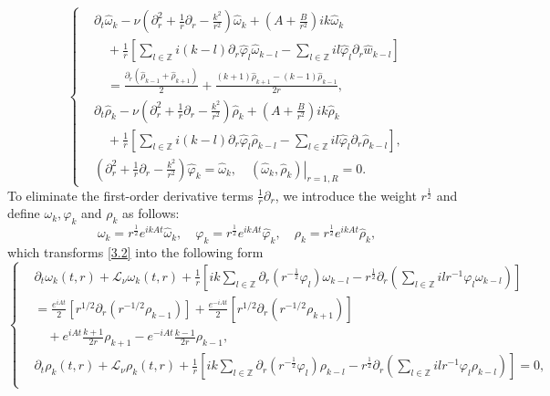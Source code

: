 \documentclass[final, 12pt,reqno]{amsart}
\numberwithin{equation}{section}
\begin{document}
\begin{equation}\label{3.2}
    \left\{
    \begin{aligned}
        &   \partial_t \hat{\omega}_k-\nu\left(\partial_r^2+\frac{1}{r} \partial_r-\frac{k^2}{r^2} \right) \hat{\omega}_k+\left(A+\frac{B}{r^2}\right) ik \hat{\omega}_k\\
  &\quad+\frac{1}{r}\left[ \sum_{l \in \mathbb{Z}} i (k-l)\partial_r\hat{\varphi}_l \hat{\omega}_{k-l}- \sum_{l \in \mathbb{Z}} i l  \hat{\varphi}_l \partial_r\hat{w}_{k-l}\right]\\
        &\quad=\frac{\partial_{r}(\hat{\rho}_{k-1}+\hat{\rho}_{k+1})}{2}+ \frac{(k+1)\hat{\rho}_{k+1}-(k-1)\hat{\rho}_{k-1}}{2r},\\
        &   \partial_t \hat{\rho}_k-\nu\left(\partial_r^2+\frac{1}{r} \partial_r-\frac{k^2}{r^2} \right) \hat{\rho}_k+\left(A+\frac{B}{r^2}\right) ik \hat{\rho}_k \\
  &\quad+\frac{1}{r}\left[ \sum_{l \in \mathbb{Z}} i (k-l)\partial_r\hat{\varphi}_l \hat{\rho}_{k-l}- \sum_{l \in \mathbb{Z}} i l  \hat{\varphi}_l \partial_r\hat{\rho}_{k-l}\right],\\
        &   \left(\partial_r^2+\frac{1}{r} \partial_r-\frac{k^2}{r^2}\right) \hat{\varphi}_k=\hat{\omega}_k,\left.\quad (\hat{\omega}_k,\hat{\rho}_k)\right|_{r=1, R}=0  .
    \end{aligned}
    \right.
\end{equation}
To eliminate the first-order derivative terms $\frac{1}{r} \partial_r$, we introduce the weight $r^{\frac{1}{2}}$ and define $\omega_k,\varphi_k$ and $\rho_k$ as follows:$$\omega_k=r^{\frac{1}{2}} e^{i k A t} \hat{\omega}_k, \quad \varphi_k=r^{\frac{1}{2}} e^{i k A t} \hat{\varphi}_k,\quad \rho_k=r^{\frac{1}{2}} e^{i k A t} \hat{\rho}_k,$$ which transforms \eqref{3.2} into the following form
\begin{equation}\label{3.3}
    \left\{
    \begin{aligned}
        &\partial_t\omega_k(t,r)+\mathcal{L}_\nu{\omega}_k(t,r)+\frac{1}{r}\left[i k \sum_{l \in \mathbb{Z}} \partial_r\left(r^{-\frac{1}{2}} \varphi_l\right) \omega_{k-l}-r^{\frac{1}{2}} \partial_r\left(\sum_{l \in \mathbb{Z}} i l r^{-1} \varphi_l \omega_{k-l}\right)\right]\\
   &=\frac{e^{iAt}}{2}\left[ r^{1/2}\partial_{r}(r^{-1/2}\rho_{k-1})\right]
        +\frac{e^{-iAt}}{2}\left[ r^{1/2}\partial_{r}(r^{-1/2}\rho_{k+1})\right]\\
  &\quad+e^{iAt}\frac{k+1}{2r}\rho_{k+1}-e^{-iAt}\frac{k-1}{2r}\rho_{k-1},\\
        &\partial_t\rho_k(t,r)+\mathcal{L}_\nu\rho_k(t,r)
  +\frac{1}{r}\left[i k \sum_{l \in \mathbb{Z}} \partial_r\left(r^{-\frac{1}{2}} \varphi_l\right) \rho_{k-l}-r^{\frac{1}{2}} \partial_r\left(\sum_{l \in \mathbb{Z}} i l r^{-1} \varphi_l \rho_{k-l}\right)\right] =0, \\
    \end{aligned}
    \right.
\end{equation}
\end{document}
